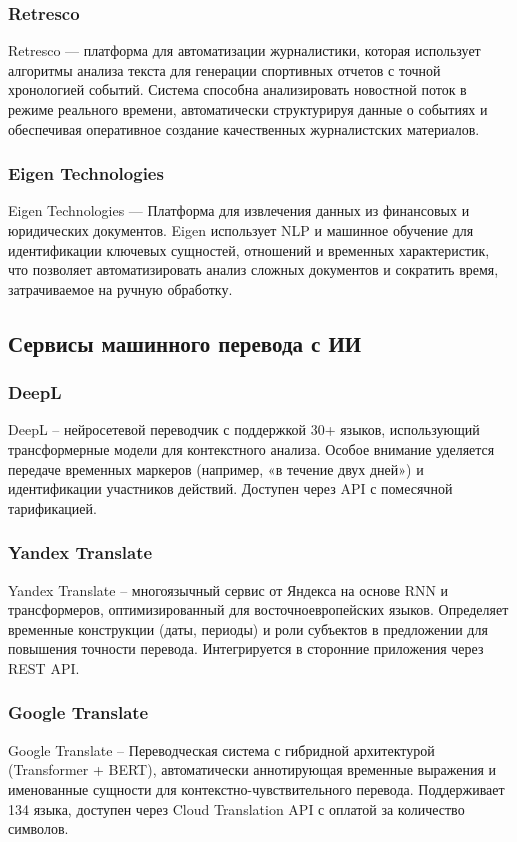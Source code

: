 \subsubsection{Retresco}
Retresco \cite{lib:Retresco} — платформа для автоматизации журналистики, которая использует алгоритмы анализа текста для генерации спортивных отчетов с точной хронологией событий. Система способна анализировать новостной поток в режиме реального времени, автоматически структурируя данные о событиях и обеспечивая оперативное создание качественных журналистских материалов.

\subsubsection{Eigen Technologies}
Eigen Technologies \cite{lib:Eigen} — Платформа для извлечения данных из финансовых и юридических документов. Eigen использует NLP и машинное обучение для идентификации ключевых сущностей, отношений и временных характеристик, что позволяет автоматизировать анализ сложных документов и сократить время, затрачиваемое на ручную обработку.

\subsection{Сервисы машинного перевода с ИИ}

\subsubsection{DeepL}
DeepL \cite{lib:DeepL} -- нейросетевой переводчик с поддержкой 30+ языков, использующий трансформерные модели для контекстного анализа. Особое внимание уделяется передаче временных маркеров (например, «в течение двух дней») и идентификации участников действий. Доступен через API с помесячной тарификацией.

\subsubsection{Yandex Translate}
Yandex Translate \cite{lib:YandexTranslate} -- многоязычный сервис от Яндекса на основе RNN и трансформеров, оптимизированный для восточноевропейских языков. Определяет временные конструкции (даты, периоды) и роли субъектов в предложении для повышения точности перевода. Интегрируется в сторонние приложения через REST API.

\subsubsection{Google Translate}
Google Translate \cite{lib:googleTranslate} -- Переводческая система с гибридной архитектурой (Transformer + BERT), автоматически аннотирующая временные выражения и именованные сущности для контекстно-чувствительного перевода. Поддерживает 134 языка, доступен через Cloud Translation API с оплатой за количество символов.

